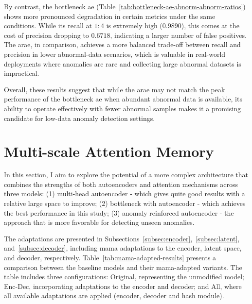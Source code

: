 By contrast, the bottleneck \gls{ae} (Table~\ref{tab:bottleneck-ae-abnorm-abnorm-ratios}) shows more pronounced degradation in certain metrics under the same conditions.
While its recall at $1:4$ is extremely high ($0.9890$), this comes at the cost of precision dropping to $0.6718$,  
indicating a larger number of false positives.
The \gls{arae}, in comparison, achieves a more balanced trade-off between recall and precision in lower abnormal-data scenarios,  
which is valuable in real-world deployments where anomalies are rare and collecting large abnormal datasets is impractical.

Overall, these results suggest that while the \gls{arae} may not match the peak performance of the bottleneck \gls{ae} when abundant abnormal data is available,  
its ability to operate effectively with fewer abnormal samples makes it a promising candidate for low-data anomaly detection settings.


\section{Multi-scale Attention Memory}
In this section, I aim to explore the potential of a more complex architecture that combines the strengths of both autoencoders and attention mechanisms across three models: 
(1) multi-head autoencoder - which gives quite good results with a relative large space to improve; 
(2) bottleneck with autoencoder - which achieves the best performance in this study; 
(3) anomaly reinforced autoencoder - the approach that is more favorable for detecting unseen anomalies.

The adaptations are presented in Subsections~\ref{subsec:encoder},~\ref{subsec:latent}, and~\ref{subsec:decoder}, including \gls{mama} adaptations to the encoder, latent space, and decoder, respectively.
Table~\ref{tab:mama-adapted-results} presents a comparison between the baseline models and their \gls{mama}-adapted variants. The table includes three configurations: Original, representing the unmodified model; Enc-Dec, incorporating adaptations to the encoder and decoder; and All, where all available adaptations are applied (encoder, decoder and hash module).


